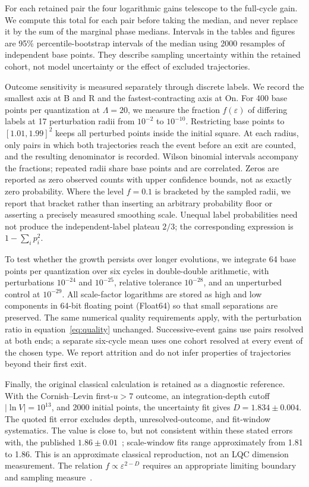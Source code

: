 \documentclass[12pt]{iopjournal}
\newcommand{\Lam}{\Lambda}
\begin{document}
For each retained pair the four logarithmic gains telescope to the full-cycle gain. We compute this total for each pair before taking the median, and never replace it by the sum of the marginal phase medians.
Intervals in the tables and figures are 95\% percentile-bootstrap intervals of the median using
2000 resamples of independent base points. They describe sampling uncertainty within the retained
cohort, not model uncertainty or the effect of excluded trajectories.

Outcome sensitivity is measured separately through discrete labels. We record the smallest axis at
B and R and the fastest-contracting axis at On. For 400 base points per quantization at $\Lam=20$, we
measure the fraction $f(\varepsilon)$ of differing labels at 17 perturbation radii from $10^{-2}$ to
$10^{-10}$. Restricting base points to $[1.01,1.99]^2$ keeps all perturbed points inside the initial
square. At each radius, only pairs in which both trajectories reach the event before an exit are counted, and the resulting denominator is recorded. Wilson binomial intervals accompany the fractions; repeated radii share base
points and are correlated. Zeros are reported as zero observed counts with upper confidence bounds,
not as exactly zero probability. Where the level $f=0.1$ is bracketed by the sampled radii, we report that bracket rather than
inserting an arbitrary probability floor or asserting a precisely measured smoothing scale. Unequal
label probabilities need not produce the independent-label plateau $2/3$; the corresponding
expression is $1-\sum_i p_i^2$.

To test whether the growth persists over longer evolutions, we integrate 64 base points per
quantization over six cycles in double-double arithmetic, with perturbations $10^{-24}$ and $10^{-25}$,
relative tolerance $10^{-28}$, and an unperturbed control at $10^{-29}$. All scale-factor logarithms are
stored as high and low components in 64-bit floating point (Float64) so that small separations are preserved. The same numerical
quality requirements apply, with the perturbation ratio in equation~\eqref{eq:quality} unchanged.
Successive-event gains use pairs resolved at both ends; a separate six-cycle mean uses one cohort
resolved at every event of the chosen type. We report attrition and do not infer properties of
trajectories beyond their first exit.

Finally, the original classical calculation is retained as a diagnostic reference. With the
Cornish--Levin first-$u>7$ outcome, an integration-depth cutoff $|\ln V|=10^{13}$, and 2000 initial
points, the uncertainty fit gives $D=1.834\pm0.004$. The quoted fit error excludes depth,
unresolved-outcome, and fit-window systematics. The value is close to, but not consistent within these stated errors with, the published $1.86\pm0.01$~\cite{CornishLevin1997}; scale-window fits range
approximately from 1.81 to 1.86. This is an approximate classical reproduction, not an LQC dimension
measurement. The relation $f\propto\varepsilon^{2-D}$ requires an appropriate limiting boundary and
sampling measure~\cite{GrebogiOttYorke1983,McDonald1985}.
\end{document}
